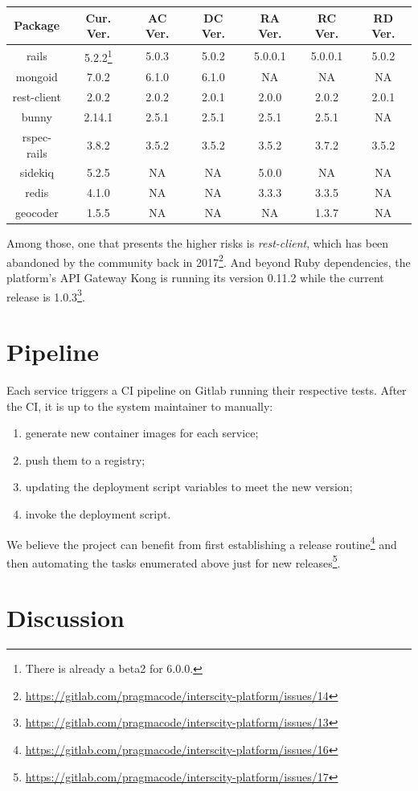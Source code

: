 \documentclass[paper=a4, fontsize=11pt]{scrartcl}
\numberwithin{equation}{section}    %
\numberwithin{figure}{section}      %
\numberwithin{table}{section}        %
\begin{document}
  \begin{center}
    \begin{tabu} to \textwidth {  c | c | c | c | c | c | c }
      \textbf{Package} & \textbf{Cur. Ver.} & \textbf{AC Ver.} & \textbf{DC Ver.} & \textbf{RA Ver.} & \textbf{RC Ver.} & \textbf{RD Ver.} \\ \hline \hline
      rails & 5.2.2\footnote{There is already a beta2 for 6.0.0.} & 5.0.3 & 5.0.2 & 5.0.0.1 & 5.0.0.1 & 5.0.2 \\ \hline
      mongoid & 7.0.2 & 6.1.0 & 6.1.0 & NA & NA & NA \\ \hline
      rest-client & 2.0.2 & 2.0.2 & 2.0.1 & 2.0.0 & 2.0.2 & 2.0.1 \\ \hline
      bunny & 2.14.1 & 2.5.1 & 2.5.1 & 2.5.1 & 2.5.1 & NA \\ \hline
      rspec-rails & 3.8.2 & 3.5.2 & 3.5.2 & 3.5.2 & 3.7.2 & 3.5.2 \\ \hline
      sidekiq & 5.2.5 & NA & NA & 5.0.0 & NA & NA \\ \hline
      redis & 4.1.0 & NA & NA & 3.3.3 & 3.3.5 & NA \\ \hline
      geocoder & 1.5.5 & NA & NA & NA & 1.3.7 & NA \\
    \end{tabu}
  \end{center}

  Among those, one that presents the higher risks is \textit{rest-client}, which has been abandoned by the community back in 2017\footnote{\url{https://gitlab.com/pragmacode/interscity-platform/issues/14}}. And beyond Ruby dependencies, the platform's API Gateway Kong is running its version 0.11.2 while the current release is 1.0.3\footnote{\url{https://gitlab.com/pragmacode/interscity-platform/issues/13}}.

\section{Pipeline}
  Each service triggers a CI pipeline on Gitlab running their respective tests. After the CI, it is up to the system maintainer to manually:

  \begin{enumerate}
    \item generate new container images for each service;
    \item push them to a registry;
    \item updating the deployment script variables to meet the new version;
    \item invoke the deployment script.
  \end{enumerate}

  We believe the project can benefit from first establishing a release routine\footnote{\url{https://gitlab.com/pragmacode/interscity-platform/issues/16}} and then automating the tasks enumerated above just for new releases\footnote{\url{https://gitlab.com/pragmacode/interscity-platform/issues/17}}.

\section{Discussion}
\label{sec:discussion}
\end{document}
